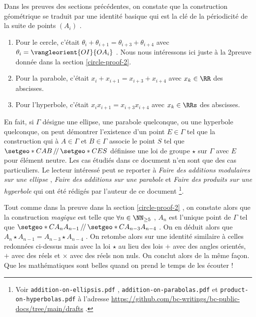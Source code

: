 Dans les preuves des sections précédentes, on constate que la construction géométrique se traduit par une identité basique qui est la clé de la périodicité de la suite de points $\left( A_i \right)$ .
\begin{enumerate}
	\item Pour le cercle, c'était $\theta_i + \theta_{i+1} = \theta_{i+3} + \theta_{i+4}$ avec $\theta_i = \vangleorient{OI}{OA_i}$ . Nous nous intéressons ici juste à la 2\ieme preuve donnée dans la section \ref{circle-proof-2}.

	\item Pour la parabole, c'était $x_i + x_{i+1} = x_{i+3} + x_{i+4}$ avec $x_k \in \RR$ des abscisses.

	\item Pour l'hyperbole, c'était  $x_i x_{i+1} = x_{i+3} x_{i+4}$ avec $x_k \in \RRs$ des abscisses.
\end{enumerate}


\medskip


En fait, si $\Gamma$ désigne une ellipse, une parabole quelconque, ou une hyperbole quelconque, on peut démontrer l'existence d'un point $E \in \Gamma$ tel que la construction qui à $A \in \Gamma$ et $B \in \Gamma$ associe le point $S$ tel que $\setgeo*{C}{AB} \,/\!/\, \setgeo*{C}{ES}$ définisse une loi de groupe $\star$ sur $\Gamma$ avec $E$ pour élément neutre.
Les cas étudiés dans ce document n'en sont que des cas particuliers.
Le lecteur intéressé peut se reporter à
\emph{\og Faire des additions modulaires sur une ellipse \fg} ,
\emph{\og Faire des additions sur une parabole \fg}
et
\emph{\og Faire des produits sur une hyperbole \fg}
qui ont été rédigés par l'auteur de ce document
\footnote{
	Voir \texttt{addition-on-ellipsis.pdf} , \texttt{addition-on-parabolas.pdf}  et \texttt{product-on-hyperbolas.pdf}  à l'adresse \url{https://github.com/bc-writings/bc-public-docs/tree/main/drafts} .
}.


\medskip


Tout comme dans la preuve dans la section \ref{circle-proof-2} , on constate alors que la construction \emph{\og magique \fg} est telle que $\forall n \in \NN_{\geq 5}$ , $A_{n}$ est l'unique point de $\Gamma$ tel que $\setgeo*{C}{A_{n} A_{n-1}} \,/\!/\, \setgeo*{C}{A_{n-3} A_{n-4}}$ . On en déduit alors que $A_{n} \star A_{n-1} = A_{n-3} \star A_{n-4}$ . On retombe alors sur une identité similaire à celles redonnées ci-dessus mais avec la loi $\star$ au lieu des lois $+$ avec des angles orientés, $+$ avec des réels et $\times$ avec des réels non nuls. On conclut alors de la même façon. Que les mathématiques sont belles quand on prend le temps de les écouter !
